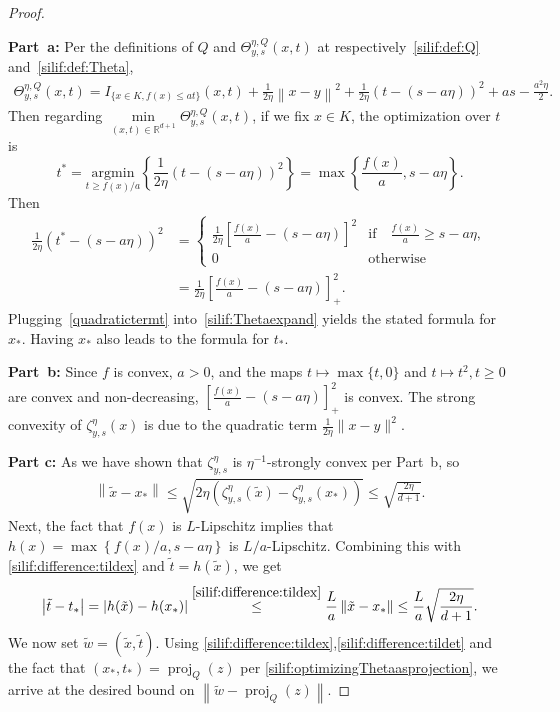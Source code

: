 \documentclass[11pt,letterpaper]{article}
\newcommand{\R}{\mathbb{R}}
\newcommand{\norm}[1]{\left\lVert #1 \right\rVert}
\newcommand{\abs}[1]{\left\vert #1 \right\rvert}
\newcommand{\proj}{\operatorname{proj}}
\newcommand{\argmin}{\mathrm{argmin}  }
\newcommand{\nn}{\nonumber}
\newcommand{\brac}[1]{\left( #1\right)}
\begin{document}
\begin{proof}  
~\

\textbf{Part~a:} Per the definitions of $Q$ and $\Theta^{\eta,Q}_{y,s}(x,t)$ at respectively~\eqref{silif:def:Q} and~\eqref{silif:def:Theta}, 
 \begin{align}
 \label{silif:Thetaexpand}
 \Theta^{\eta,Q}_{y,s}(x,t)
= I_{\{x\in K,f(x)\leq at\}}(x,t)+ \frac{1}{2\eta}\norm{x-y}^2+\frac{1}{2\eta}(t-(s-a\eta))^2+as-\frac{a^2\eta}{2}. 
 \end{align}
 Then regarding  $\underset{(x,t)\in\R^{d+1}}{\min} \Theta^{\eta,Q}_{y,s}(x,t)$, if we fix $x\in K$, the optimization over $t$ is 
\[
t^*= \underset{t \ge f(x)/a}{\argmin}\left\{
\frac{1}{2\eta}\left(t-(s - a\eta)\right)^2 \right\}
=\max\left\{ \frac{f(x)}{a}, s - a\eta \right\}.
\]
Then 
\begin{align}
\label{quadratictermt}
\frac{1}{2\eta}\left(t^*-(s - a\eta)\right)^2&=\begin{cases}
    \frac{1}{2\eta}\left[\frac{f(x)}{a}-(s - a\eta)\right]^2 &\text{if} \quad \frac{f(x)}{a}\geq s-a\eta,\\
    0 &\text{otherwise} 
\end{cases}\nn\\
&=\frac{1}{2\eta}\left[ \frac{f(x)}{a} - (s - a\eta)\right]_{+}^2. 
\end{align}
Plugging~\eqref{quadratictermt} into~\eqref{silif:Thetaexpand} yields the stated formula for $x_*$. Having $x_*$ also leads to the formula for $t_*$. 

\textbf{Part~b:} Since $f$ is convex, $a>0$, and the maps $t \mapsto \max\{t,0\}$ and $t \mapsto t^2, t\ge0$ are convex and non-decreasing, $\left[ \frac{f(x)}{a} - (s - a\eta)\right]_{+}^2$ is convex. The strong convexity of $\zeta^{\eta}_{y,s}(x)$ is due to the quadratic term $\frac{1}{2\eta}\|x-y\|^2$. 


\textbf{Part c:}  As we have shown that $\zeta^{\eta}_{y,s}$ is $\eta^{-1}$-strongly convex per Part~b, so
    \begin{align}
    \label{silif:difference:tildex}
        \norm{\tilde{x}-x_*}\leq \sqrt{2\eta\brac{\zeta^{\eta}_{y,s}(\tilde{x})-\zeta^{\eta}_{y,s}(x_*) }}\leq \sqrt{\frac{2\eta}{d+1}}. 
    \end{align}
Next, the fact that $f(x)$ is $L$-Lipschitz implies that $h(x)=\max \left\{f(x)/a,s-a\eta\right\}$ is $L/a$-Lipschitz. Combining this with \eqref{silif:difference:tildex} and $\tilde{t}=h(\tilde{x})$, we get 
\begin{align}
\label{silif:difference:tildet}
    \abs{\tilde{t}-t_*}=\abs{h(\tilde{x})-h(x_*) }\stackrel{\eqref{silif:difference:tildex}}{\leq} \frac{L}{a}\norm{\tilde{x}-x_*}\leq \frac{L}{a}\sqrt{\frac{2\eta}{d+1}}.  
\end{align}
We now set $\tilde{w}=(\tilde{x},\tilde{t})$. Using \eqref{silif:difference:tildex},\eqref{silif:difference:tildet} and the fact that $(x_*,t_*)=\proj_Q(z)$ per \eqref{silif:optimizingThetaasprojection}, we arrive at the desired bound on $\norm{\tilde{w}- \proj_Q(z)}$. 
\end{proof}
\end{document}
